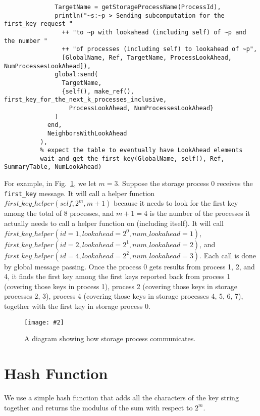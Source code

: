\documentclass[11pt]{article}
\newcommand{\pic}[2]{\begin{center}\texttt{[image: \#2]}\end{center}}
\begin{document}
\begin{algorithm}[H]
\begin{lstlisting}
              TargetName = getStorageProcessName(ProcessId),
              println("~s:~p > Sending subcomputation for the first_key request "
                ++ "to ~p with lookahead (including self) of ~p and the number "
                ++ "of processes (including self) to lookahead of ~p",
                [GlobalName, Ref, TargetName, ProcessLookAhead, NumProcessesLookAhead]),
              global:send(
                TargetName,
                {self(), make_ref(), first_key_for_the_next_k_processes_inclusive,
                  ProcessLookAhead, NumProcessesLookAhead}
              )
            end,
            NeighborsWithLookAhead
          ),
          % expect the table to eventually have LookAhead elements
          wait_and_get_the_first_key(GlobalName, self(), Ref, SummaryTable, NumLookAhead)
\end{lstlisting}
\end{algorithm}

For example, in Fig.~\ref{fig:circle}, we let $m = 3$. Suppose the storage process 0 receives the \texttt{first\_key} message. It will call a helper function $first\_key\_helper(self, 2^m, m + 1)$ because it needs to look for the first key among the total of 8 processes, and $m + 1 = 4$ is the number of the processes it actually needs to call a helper function on (including itself). It will call
$first\_key\_helper(id = 1, lookahead = 2^0, num\_lookahead = 1)$,
$first\_key\_helper(id = 2, lookahead = 2^1, num\_lookahead = 2)$, and
$first\_key\_helper(id = 4, lookahead = 2^2, num\_lookahead = 3)$. Each call is done by global message passing. Once the process 0 gets results from process 1, 2, and 4, it finds the first key among the first keys reported back from process 1 (covering those keys in process 1),
process 2 (covering those keys in storage processes 2, 3),
process 4 (covering those keys in storage processes 4, 5, 6, 7),
together with the first key in storage process 0.
\begin{figure}[H]
\pic{0.35}{circle}
\label{fig:circle}
\caption{A diagram showing how storage process communicates.}
\end{figure}
\section{Hash Function}
We use a simple hash function that adds all the characters of the key string together and returns the modulus of the sum with respect to $2^m.$
\end{document}
